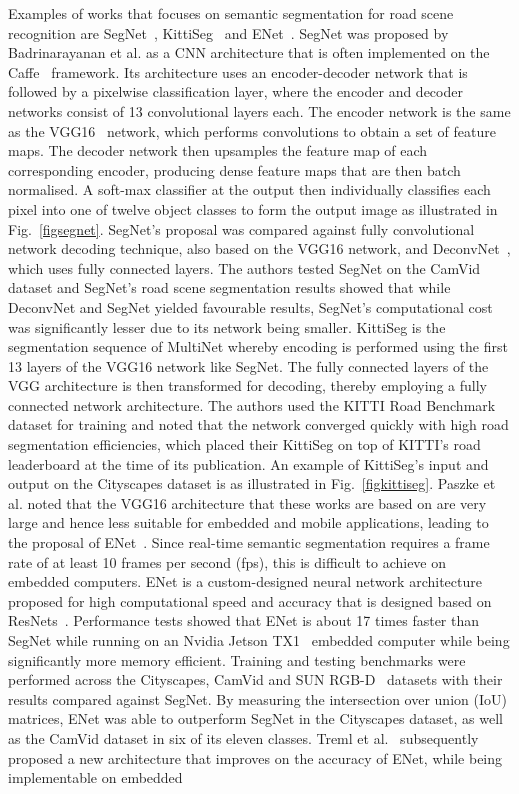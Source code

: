 Examples of works that focuses on semantic segmentation for road scene recognition are SegNet~\cite{badrinarayanan_segnet:_2017}, KittiSeg~\cite{teichmann_multinet:_2016} and ENet~\cite{paszke_enet:_2016}. SegNet was proposed by Badrinarayanan et al. as a CNN architecture that is often implemented on the Caffe~\cite{jia_caffe:_2014} framework. Its architecture uses an encoder-decoder network that is followed by a pixelwise classification layer, where the encoder and decoder networks consist of 13 convolutional layers each. The encoder network is the same as the VGG16~\cite{simonyan_very_2014} network, which performs convolutions to obtain a set of feature maps. The decoder network then upsamples the feature map of each corresponding encoder, producing dense feature maps that are then batch normalised. A soft-max classifier at the output then individually classifies each pixel into one of twelve object classes to form the output image as illustrated in Fig.~\ref{figsegnet}. SegNet's proposal was compared against fully convolutional network decoding technique, also based on the VGG16 network, and DeconvNet~\cite{zeiler_visualizing_2014}, which uses fully connected layers. The authors tested SegNet on the CamVid dataset and SegNet's road scene segmentation results showed that while DeconvNet and SegNet yielded favourable results, SegNet's computational cost was significantly lesser due to its network being smaller. KittiSeg is the segmentation sequence of MultiNet whereby encoding is performed using the first 13 layers of the VGG16 network like SegNet. The fully connected layers of the VGG architecture is then transformed for decoding, thereby employing a fully connected network architecture. The authors used the KITTI Road Benchmark dataset for training and noted that the network converged quickly with high road segmentation efficiencies, which placed their KittiSeg on top of KITTI's road leaderboard at the time of its publication. An example of KittiSeg's input and output on the Cityscapes dataset is as illustrated in Fig.~\ref{figkittiseg}. Paszke et al. noted that the VGG16 architecture that these works are based on are very large and hence less suitable for embedded and mobile applications, leading to the proposal of ENet~\cite{paszke_enet:_2016}. Since real-time semantic segmentation requires a frame rate of at least 10 frames per second (fps), this is difficult to achieve on embedded computers. ENet is a custom-designed neural network architecture proposed for high computational speed and accuracy that is designed based on ResNets~\cite{k._he_deep_2016}.  Performance tests showed that ENet is about 17 times faster than SegNet while running on an Nvidia Jetson TX1~\cite{nvidia_corporation_embedded_2017-1} embedded computer while being significantly more memory efficient. Training and testing benchmarks were performed across the Cityscapes, CamVid and SUN RGB-D~\cite{s._song_sun_2015} datasets with their results compared against SegNet. By measuring the intersection over union (IoU) matrices, ENet was able to outperform SegNet in the Cityscapes dataset, as well as the CamVid dataset in six of its eleven classes. Treml et al.~\cite{treml_speeding_2016} subsequently proposed a new architecture that improves on the accuracy of ENet, while being implementable on embedded 